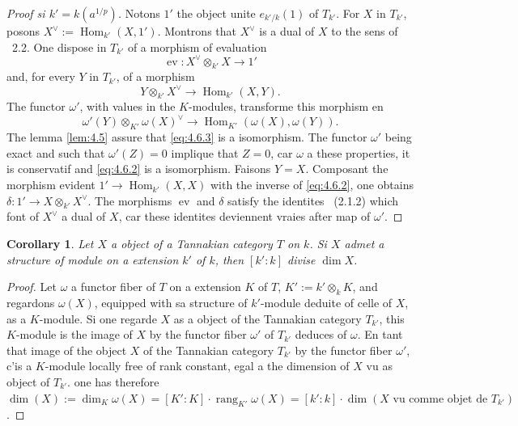 \documentclass[11pt,a4paper]{article}
\theoremstyle{plain}
\newtheorem{corollary}[theorem]{Corollary}
\theoremstyle{definition}
\DeclareMathOperator{\Hom}{Hom}
\DeclareMathOperator{\ev}{ev}
\DeclareMathOperator{\rang}{rang}
\begin{document}
\begin{proof}[Proof si $k' = k(a^{1/p})$]
Notons $1'$ the object unite $e_{k'/k}(1)$ of $T_{k'}$. For $X$ in $T_{k'}$, posons $X^\vee := \Hom_{k'}(X, 1')$. Montrons that $X^\vee$ is a dual of $X$ to the sens of \cite{Deligne1990}~2.2. One dispose in $T_{k'}$ of a morphism of evaluation
\begin{equation}\label{eq:4.6.1}
\ev: X^\vee \otimes_{k'} X \longrightarrow 1'
\end{equation}
and, for every $Y$ in $T_{k'}$, of a morphism
\begin{equation}\label{eq:4.6.2}
Y \otimes_{k'} X^\vee \longrightarrow \Hom_{k'}(X, Y).
\end{equation}
The functor $\omega'$, with values in the $K$-modules, transforme this morphism en
\begin{equation}\label{eq:4.6.3}
\omega'(Y) \otimes_{K'} \omega(X)^\vee \longrightarrow \Hom_{K'}(\omega(X), \omega(Y)).
\end{equation}
The lemma \ref{lem:4.5} assure that \eqref{eq:4.6.3} is a isomorphism. The functor $\omega'$ being exact and such that $\omega'(Z) = 0$ implique that $Z = 0$, car $\omega$ a these properties, it is conservatif and \eqref{eq:4.6.2} is a isomorphism. Faisons $Y = X$. Composant the morphism evident $1' \to \Hom_{k'}(X, X)$ with the inverse of \eqref{eq:4.6.2}, one obtains $\delta: 1' \to X \otimes_{k'} X^\vee$. The morphisms $\ev$ and $\delta$ satisfy the identites \cite{Deligne1990}~(2.1.2) which font of $X^\vee$ a dual of $X$, car these identites deviennent vraies after map of $\omega'$.
\end{proof}

\begin{corollary}\label{cor:4.7}
Let $X$ a object of a Tannakian category $T$ on $k$. Si $X$ admet a structure of module on a extension $k'$ of $k$, then $[k':k]$ divise $\dim X$.
\end{corollary}

\begin{proof}
Let $\omega$ a functor fiber of $T$ on a extension $K$ of $T$, $K' := k' \otimes_k K$, and regardons $\omega(X)$, equipped with sa structure of $k'$-module deduite of celle of $X$, as a $K$-module. Si one regarde $X$ as a object of the Tannakian category $T_{k'}$, this $K$-module is the image of $X$ by the functor fiber $\omega'$ of $T_{k'}$ deduces of $\omega$. En tant that image of the object $X$ of the Tannakian category $T_{k'}$ by the functor fiber $\omega'$, c'is a $K$-module locally free of rank constant, egal a the dimension of $X$ vu as object of $T_{k'}$. one has therefore $\dim(X) := \dim_K \omega(X) = [K':K] \cdot \rang_{K'} \omega(X) = [k':k] \cdot \dim(X \text{ vu comme objet de } T_{k'})$.
\end{proof}
\end{document}
